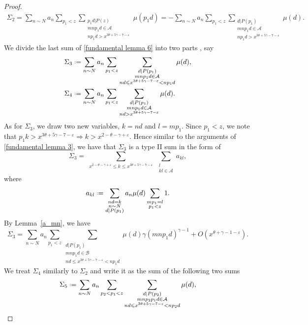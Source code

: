 \documentclass[12pt, reqno, twoside, letterpaper]{amsart}
\numberwithin{equation}{section}
\newcommand{\cA}{\ensuremath{\mathcal{A}}}
\newcommand{\cB}{\ensuremath{\mathcal{B}}}
\theoremstyle{customthm}
\theoremstyle{customrem}
\newcommand*{\defeq}{\mathrel{\vcenter{\baselineskip0.5ex \lineskiplimit0pt
			\hbox{\scriptsize.}\hbox{\scriptsize.}}}%
	=}
\begin{document}
\begin{proof}
\begin{align}\label{fundamental lemma 6}
\Sigma_2 = \sum_{n \sim N} a_n \sum_{p_1 < z} \sum_{\substack{p_1d|P(z) \\ mnp_1d \in \cA \\ np_1d > x^{3\theta+5\gamma-7-\varepsilon}}} \mu(p_1d) = - \sum_{n \sim N}a_n \sum_{p_1 < z} \sum_{\substack{d|P(p_1) \\ mnp_1d \in \cA \\ np_1d > x^{3\theta+5\gamma-7-\varepsilon}}} \mu(d).
\end{align}
We divide the last sum of \eqref{fundamental lemma 6} into two parts , say
\begin{align*}
&\Sigma_3 \defeq \sum_{n \sim N}a_n \sum_{p_1 < z} \sum_{\substack{d|P(p_1) \\ mnp_1d \in \cA \\ nd \leqslant x^{3\theta+5\gamma-7-\varepsilon} < np_1d}} \mu(d) , \\
&\Sigma_4 \defeq \sum_{n \sim N}a_n \sum_{p_1 < z} \sum_{\substack{d|P(p_1) \\ mnp_1d \in \cA \\ nd > x^{3\theta+5\gamma-7-\varepsilon}}} \mu(d).
\end{align*}
As for $\Sigma_3$, we draw two new variables, $k = nd$ and $l=mp_1$. Since $p_1 < z$, we note that $p_1k > x^{3\theta+5\gamma-7-\varepsilon} \Rightarrow k > x^{2 - \theta - \gamma +\varepsilon}.$ Hence similar to the arguments of \eqref{fundamental lemma 3}, we have that $\Sigma_3$ is a type II sum in the form of 
$$
\Sigma_3 = \sum_{\substack{ x^{2-\theta -\gamma + \varepsilon} \leqslant k \leqslant x^{3\theta+5\gamma-7-\varepsilon}}} \sum_{\substack{ l \\ kl\in \cA}} a_{kl},
$$ 
where 
$$
a_{kl} \defeq  \sum_{\substack{ nd = k \\ n \sim N \\ d|P(p_1)}} a_n \mu(d)\sum_{\substack{mp_1 = l \\ p_1 < z}}1.
$$
By Lemma~\ref{a_mn}, we have
$$
\Sigma_3 = \sum_{n \sim N}a_n \sum_{p_1 < z} \sum_{\substack{d|P(p_1) \\ mnp_1d \in \cB \\ nd \leqslant x^{3\theta+5\gamma-7-\varepsilon} < np_1d}} \mu(d) \gamma (mnp_1d)^{\gamma-1} + O(x^{\theta + \gamma - 1 - \varepsilon}).
$$
We treat $\Sigma_4$ similarly to $\Sigma_2$ and write it as the sum of the following two sums
\begin{align*}
&\Sigma_5 \defeq \sum_{n \sim N}a_n \sum_{p_2 < p_1 < z} \sum_{\substack{d|P(p_2) \\ mnp_2p_1d \in \cA \\ nd \leqslant x^{3\theta+5\gamma-7-\varepsilon} < np_2d}} \mu(d) , \\

\end{align*}
\end{proof}
\end{document}
